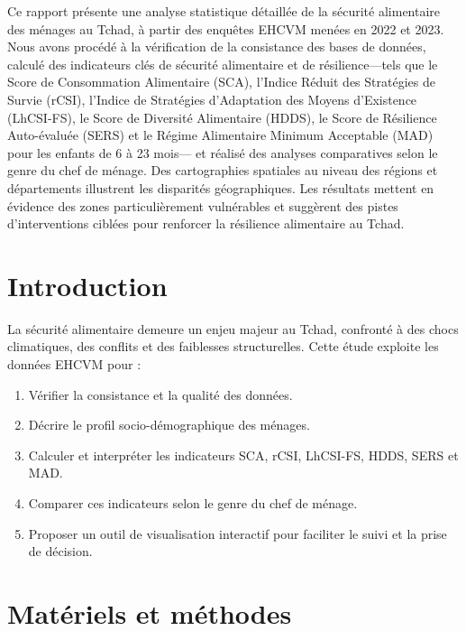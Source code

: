 \documentclass[
]{article}
\providecommand{\tightlist}{%
  \setlength{\itemsep}{0pt}\setlength{\parskip}{0pt}}
\begin{document}
Ce rapport présente une analyse statistique détaillée de la sécurité
alimentaire des ménages au Tchad, à partir des enquêtes EHCVM menées en
2022 et 2023. Nous avons procédé à la vérification de la consistance des
bases de données, calculé des indicateurs clés de sécurité alimentaire
et de résilience---tels que le Score de Consommation Alimentaire (SCA),
l'Indice Réduit des Stratégies de Survie (rCSI), l'Indice de Stratégies
d'Adaptation des Moyens d'Existence (LhCSI-FS), le Score de Diversité
Alimentaire (HDDS), le Score de Résilience Auto-évaluée (SERS) et le
Régime Alimentaire Minimum Acceptable (MAD) pour les enfants de 6 à 23
mois--- et réalisé des analyses comparatives selon le genre du chef de
ménage. Des cartographies spatiales au niveau des régions et
départements illustrent les disparités géographiques. Les résultats
mettent en évidence des zones particulièrement vulnérables et suggèrent
des pistes d'interventions ciblées pour renforcer la résilience
alimentaire au Tchad.

\newpage

\hypertarget{introduction}{%
\section{Introduction}\label{introduction}}

La sécurité alimentaire demeure un enjeu majeur au Tchad, confronté à
des chocs climatiques, des conflits et des faiblesses structurelles.
Cette étude exploite les données EHCVM pour :

\begin{enumerate}
\def\labelenumi{\arabic{enumi}.}
\tightlist
\item
  Vérifier la consistance et la qualité des données.
\item
  Décrire le profil socio-démographique des ménages.
\item
  Calculer et interpréter les indicateurs SCA, rCSI, LhCSI-FS, HDDS,
  SERS et MAD.
\item
  Comparer ces indicateurs selon le genre du chef de ménage.
\item
  Proposer un outil de visualisation interactif pour faciliter le suivi
  et la prise de décision.
\end{enumerate}

\hypertarget{matuxe9riels-et-muxe9thodes}{%
\section{Matériels et méthodes}\label{matuxe9riels-et-muxe9thodes}}
\end{document}
